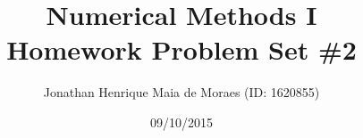 \title{Numerical Methods I \\ Homework Problem Set \#2}
\author{Jonathan Henrique Maia de Moraes (ID: 1620855)}
\date{09/10/2015}
\maketitle